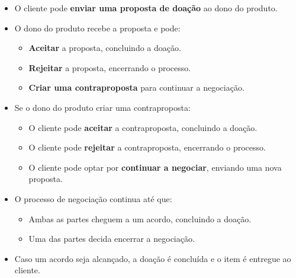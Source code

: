 \documentclass[a4paper, 12pt]{article} %
\begin{document}
\begin{itemize}
	\item O cliente pode \textbf{enviar uma proposta de doação} ao dono do produto.
	\item O dono do produto recebe a proposta e pode:
	\begin{itemize}
		\item \textbf{Aceitar} a proposta, concluindo a doação.
		\item \textbf{Rejeitar} a proposta, encerrando o processo.
		\item \textbf{Criar uma contraproposta} para continuar a negociação.
	\end{itemize}
	\item Se o dono do produto criar uma contraproposta:
	\begin{itemize}
		\item O cliente pode \textbf{aceitar} a contraproposta, concluindo a doação.
		\item O cliente pode \textbf{rejeitar} a contraproposta, encerrando o processo.
		\item O cliente pode optar por \textbf{continuar a negociar}, enviando uma nova proposta.
	\end{itemize}
	\item O processo de negociação continua até que:
	\begin{itemize}
		\item Ambas as partes cheguem a um acordo, concluindo a doação.
		\item Uma das partes decida encerrar a negociação.
	\end{itemize}
	\item Caso um acordo seja alcançado, a doação é concluída e o item é entregue ao cliente.
\end{itemize}
\end{document}

